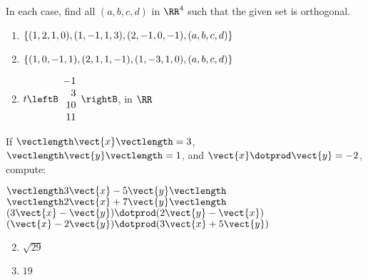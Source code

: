 \begin{multicols}{2}
\begin{ex}
\begin{sol}
\begin{enumerate}[label={\alph*.}]
\end{enumerate}
\end{sol}
\end{ex}

\begin{ex}
In each case, find all $(a, b, c, d)$ in $\RR^4$ such that the given set is orthogonal.

\begin{enumerate}[label={\alph*.}]
\item $\{(1, 2, 1, 0), (1, -1, 1, 3), (2, -1, 0, -1), \\ (a, b, c, d)\}$

\item $\{(1, 0, -1, 1), (2, 1, 1, -1), (1, -3, 1, 0), \\ (a, b, c, d)\}$

\end{enumerate}
\begin{sol}
\begin{enumerate}[label={\alph*.}]
\setcounter{enumi}{1}
\item 
$t \leftB \begin{array}{r}
-1\\
3\\
10\\
11
\end{array} \rightB$, in $\RR$

\end{enumerate}
\end{sol}
\end{ex}

\begin{ex}
If $\vectlength\vect{x}\vectlength = 3$, $\vectlength\vect{y}\vectlength = 1$, and $\vect{x} \dotprod \vect{y} = -2$, compute:

\begin{exenumerate}
\exitem $\vectlength 3\vect{x} - 5\vect{y}\vectlength$
\exitem $\vectlength 2\vect{x} + 7\vect{y}\vectlength$
\exitem $(3\vect{x} - \vect{y}) \dotprod (2\vect{y} - \vect{x})$
\exitem $(\vect{x} - 2\vect{y}) \dotprod (3\vect{x} + 5\vect{y})$
\end{exenumerate}
\begin{sol}
\begin{enumerate}[label={\alph*.}]
\setcounter{enumi}{1}
\item  $\sqrt{29}$

\setcounter{enumi}{3}
\item  $19$

\end{enumerate}
\end{sol}
\end{ex}


\end{multicols}
